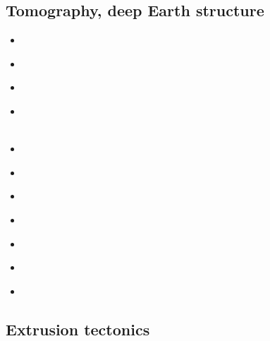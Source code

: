 \subsection{Tomography, deep Earth structure}
\begin{scriptsize}
\begin{itemize}
\item[\nineteeneightyone] 
\textcite{dzan81} \\
\item[\nineteenninetyone] 
\textcite{spak91} \\
\item[\nineteenninetythree] 
\textcite{kara93} \\
\item[\nineteenninetyeight] 
\textcite{sagu98} \\
\textcite{gusa98} \\
\item[\twothousandnine] 
\textcite{scbr09} \\
\item[\twothousandthree] 
\textcite{pimo03} \\
\item[\twothousandten] 
\textcite{sifb10} \\ 
\item[\twothousandeleven]
\textcite{ridv11} \\
\item[\twothousandthirteen] 
\textcite{fopa13} \\ 
\item[\twothousandsixteen] 
\textcite{moek16} \\
\item[\twothousandeighteen] 
\textcite{homs18} \\
\end{itemize}
\end{scriptsize}


\subsection{Extrusion tectonics}



